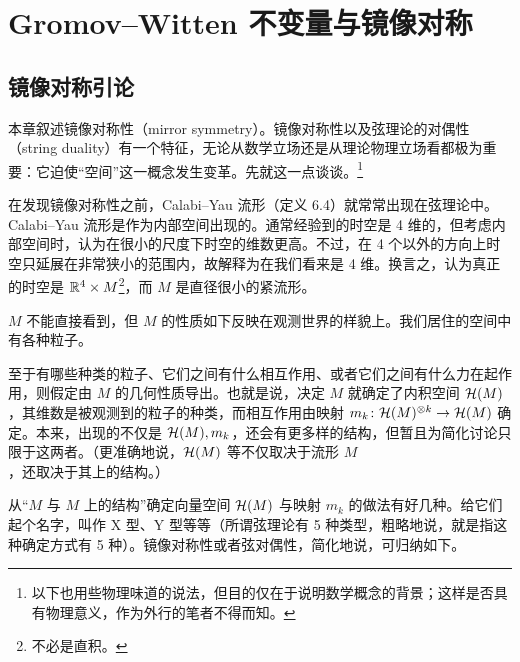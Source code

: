\chapter{Gromov–Witten 不变量与镜像对称}

\section{镜像对称引论}


本章叙述镜像对称性（mirror symmetry）。镜像对称性以及弦理论的对偶性（string duality）有一个特征，无论从数学立场还是从理论物理立场看都极为重要：它迫使“空间”这一概念发生变革。先就这一点谈谈。\footnote{以下也用些物理味道的说法，但目的仅在于说明数学概念的背景；这样是否具有物理意义，作为外行的笔者不得而知。}

在发现镜像对称性之前，Calabi–Yau 流形（定义 6.4）就常常出现在弦理论中。Calabi–Yau 流形是作为内部空间出现的。通常经验到的时空是 4 维的，但考虑内部空间时，认为在很小的尺度下时空的维数更高。不过，在 4 个以外的方向上时空只延展在非常狭小的范围内，故解释为在我们看来是 4 维。换言之，认为真正的时空是 $\mathbb{R}^4\times M$\footnote{不必是直积。}，而 $M$ 是直径很小的紧流形。

$M$ 不能直接看到，但 $M$ 的性质如下反映在观测世界的样貌上。我们居住的空间中有各种粒子。

至于有哪些种类的粒子、它们之间有什么相互作用、或者它们之间有什么力在起作用，则假定由 $M$ 的几何性质导出。也就是说，决定 $M$ 就确定了内积空间 $\mathcal{H}(M)$，其维数是被观测到的粒子的种类，而相互作用由映射 $m_k\colon\mathcal{H}(M)^{\otimes k}\to\mathcal{H}(M)$ 确定。本来，出现的不仅是 $\mathcal{H}(M),m_k$，还会有更多样的结构，但暂且为简化讨论只限于这两者。（更准确地说，$\mathcal{H}(M)$ 等不仅取决于流形 $M$，还取决于其上的结构。）

从“$M$ 与 $M$ 上的结构”确定向量空间 $\mathcal{H}(M)$ 与映射 $m_k$ 的做法有好几种。给它们起个名字，叫作 X 型、Y 型等等（所谓弦理论有 5 种类型，粗略地说，就是指这种确定方式有 5 种）。镜像对称性或者弦对偶性，简化地说，可归纳如下。

